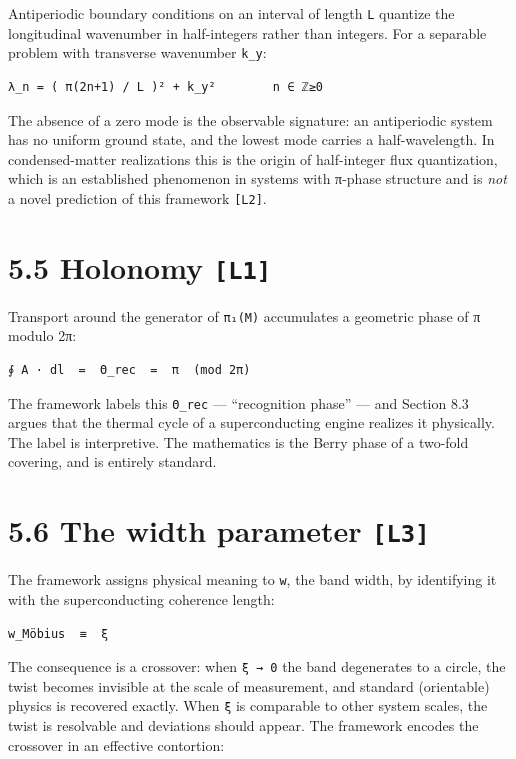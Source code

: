 \documentclass[
  11pt]{report}
\begin{document}
Antiperiodic boundary conditions on an interval of length \texttt{L}
quantize the longitudinal wavenumber in half-integers rather than
integers. For a separable problem with transverse wavenumber
\texttt{k\_y}:

\begin{verbatim}
λ_n = ( π(2n+1) / L )² + k_y²        n ∈ ℤ≥0
\end{verbatim}

The absence of a zero mode is the observable signature: an antiperiodic
system has no uniform ground state, and the lowest mode carries a
half-wavelength. In condensed-matter realizations this is the origin of
half-integer flux quantization, which is an established phenomenon in
systems with π-phase structure and is \emph{not} a novel prediction of
this framework \texttt{{[}L2{]}}.

\hypertarget{holonomy-l1}{%
\section{\texorpdfstring{5.5 Holonomy
\texttt{{[}L1{]}}}{5.5 Holonomy {[}L1{]}}}\label{holonomy-l1}}

Transport around the generator of \texttt{π₁(M)} accumulates a geometric
phase of π modulo 2π:

\begin{verbatim}
∮ A · dl  =  Θ_rec  =  π  (mod 2π)
\end{verbatim}

The framework labels this \texttt{Θ\_rec} --- ``recognition phase'' ---
and Section 8.3 argues that the thermal cycle of a superconducting
engine realizes it physically. The label is interpretive. The
mathematics is the Berry phase of a two-fold covering, and is entirely
standard.

\hypertarget{the-width-parameter-l3}{%
\section{\texorpdfstring{5.6 The width parameter
\texttt{{[}L3{]}}}{5.6 The width parameter {[}L3{]}}}\label{the-width-parameter-l3}}

The framework assigns physical meaning to \texttt{w}, the band width, by
identifying it with the superconducting coherence length:

\begin{verbatim}
w_Möbius  ≡  ξ
\end{verbatim}

The consequence is a crossover: when \texttt{ξ\ →\ 0} the band
degenerates to a circle, the twist becomes invisible at the scale of
measurement, and standard (orientable) physics is recovered exactly.
When \texttt{ξ} is comparable to other system scales, the twist is
resolvable and deviations should appear. The framework encodes the
crossover in an effective contortion:
\end{document}

